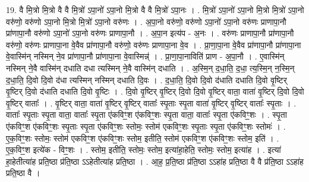 \documentclass[17pt]{extarticle}
\begin{document}
19. वै मि॒त्रो मि॒त्रो वै वै मि॒त्रो॑ ऽपा॒नो॑ ऽपा॒नो मि॒त्रो वै वै मि॒त्रो॑ ऽपा॒नः । . मि॒त्रो॑ ऽपा॒नो॑ ऽपा॒नो मि॒त्रो मि॒त्रो॑ ऽपा॒नो वरु॑णो॒ वरु॑णो ऽपा॒नो मि॒त्रो मि॒त्रो॑ ऽपा॒नो वरु॑णः । . अ॒पा॒नो वरु॑णो॒ वरु॑णो ऽपा॒नो॑ ऽपा॒नो वरु॑णः प्राणापा॒नौ प्रा॑णापा॒नौ वरु॑णो ऽपा॒नो॑ ऽपा॒नो वरु॑णः प्राणापा॒नौ । . अ॒पा॒न इत्य॑प - अ॒नः । . वरु॑णः प्राणापा॒नौ प्रा॑णापा॒नौ वरु॑णो॒ वरु॑णः प्राणापा॒ना वे॒वैव प्रा॑णापा॒नौ वरु॑णो॒ वरु॑णः प्राणापा॒ना वे॒व । . प्रा॒णा॒पा॒ना वे॒वैव प्रा॑णापा॒नौ प्रा॑णापा॒ना वे॒वास्मि॑न् नस्मिन् ने॒व प्रा॑णापा॒नौ प्रा॑णापा॒ना वे॒वास्मिन्न्॑ । . प्रा॒णा॒पा॒नाविति॑ प्राण - अ॒पा॒नौ । . ए॒वास्मि॑न् नस्मिन् ने॒वै वास्मि॑न् दधाति दधा त्यस्मिन् ने॒वै वास्मि॑न् दधाति । . अ॒स्मि॒न् द॒धा॒ति॒ द॒धा॒ त्य॒स्मि॒न् न॒स्मि॒न् द॒धा॒ति॒ दि॒वो दि॒वो द॑धा त्यस्मिन् नस्मिन् दधाति दि॒वः । . द॒धा॒ति॒ दि॒वो दि॒वो द॑धाति दधाति दि॒वो वृ॒ष्टिर् वृ॒ष्टिर् दि॒वो द॑धाति दधाति दि॒वो वृ॒ष्टिः । . दि॒वो वृ॒ष्टिर् वृ॒ष्टिर् दि॒वो दि॒वो वृ॒ष्टिर् वाता॒ वाता॑ वृ॒ष्टिर् दि॒वो दि॒वो वृ॒ष्टिर् वाताः᳚ । . वृ॒ष्टिर् वाता॒ वाता॑ वृ॒ष्टिर् वृ॒ष्टिर् वाताः᳚ स्पृ॒ताः स्पृ॒ता वाता॑ वृ॒ष्टिर् वृ॒ष्टिर् वाताः᳚ स्पृ॒ताः । . वाताः᳚ स्पृ॒ताः स्पृ॒ता वाता॒ वाताः᳚ स्पृ॒ता ए॑कविꣳ॒॒श ए॑कविꣳ॒॒शः स्पृ॒ता वाता॒ वाताः᳚ स्पृ॒ता ए॑कविꣳ॒॒शः । . स्पृ॒ता ए॑कविꣳ॒॒श ए॑कविꣳ॒॒शः स्पृ॒ताः स्पृ॒ता ए॑कविꣳ॒॒शः स्तोमः॒ स्तोम॑ एकविꣳ॒॒शः स्पृ॒ताः स्पृ॒ता ए॑कविꣳ॒॒शः स्तोमः॑ । . ए॒क॒विꣳ॒॒शः स्तोमः॒ स्तोम॑ एकविꣳ॒॒श ए॑कविꣳ॒॒शः स्तोम॒ इतीति॒ स्तोम॑ एकविꣳ॒॒श ए॑कविꣳ॒॒शः स्तोम॒ इति॑ । . ए॒क॒विꣳ॒॒श इत्ये॑क - विꣳ॒॒शः । . स्तोम॒ इतीति॒ स्तोमः॒ स्तोम॒ इत्या॑हा॒हेति॒ स्तोमः॒ स्तोम॒ इत्या॑ह । . इत्या॑ हा॒हेतीत्या॑ह प्रति॒ष्ठा प्र॑ति॒ष्ठा ऽऽहेतीत्या॑ह प्रति॒ष्ठा । . आ॒ह॒ प्र॒ति॒ष्ठा प्र॑ति॒ष्ठा ऽऽहा॑ह प्रति॒ष्ठा वै वै प्र॑ति॒ष्ठा ऽऽहा॑ह प्रति॒ष्ठा वै । \newline
\end{document}
